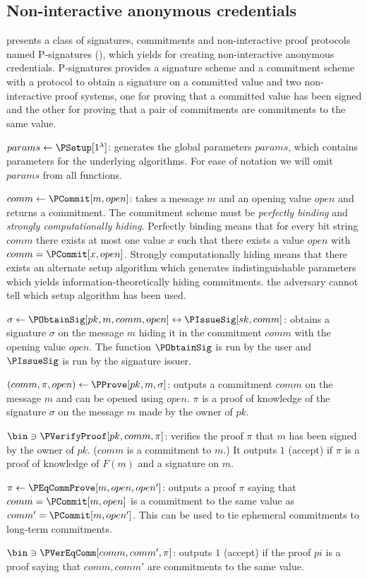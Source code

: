 \subsection{Non-interactive anonymous credentials}%
\label{NIZK-anon-cred}


 presents a class of signatures, commitments and 
non-interactive proof protocols named P-signatures (\Psig), which yields for 
creating non-interactive anonymous credentials.
P-signatures provides a signature scheme and a commitment scheme with a protocol 
to obtain a signature on a committed value and two non-interactive proof 
systems, one for proving that a committed value has been signed and the other 
for proving that a pair of commitments are commitments to the same value.


\(params\gets \PSetup[1^\lambda]\): generates the global parameters \(params\), 
which contains parameters for the underlying algorithms.
For ease of notation we will omit \(params\) from all functions.


\(comm\gets \PCommit[m, open]\): takes a message \(m\) and an opening value 
\(open\) and returns a commitment.
The commitment scheme must be \emph{perfectly binding} and \emph{strongly 
  computationally hiding}.
Perfectly binding means that for every bit string \(comm\) there exists at most 
one value \(x\) such that there exists a value \(open\) with \(comm = 
  \PCommit[x, open]\).
Strongly computationally hiding means that there exists an alternate setup 
algorithm which generates indistinguishable parameters which yields 
information-theoretically hiding commitments.
\Ie the adversary cannot tell which setup algorithm has been used.


\(\sigma\gets \PObtainSig[pk, m, comm, open]\leftrightarrow
  \PIssueSig[sk, comm]\): obtains a signature \(\sigma\) on the message 
\(m\) hiding it in the commitment \(comm\) with the opening value \(open\).
The function \(\PObtainSig\) is run by the user and \(\PIssueSig\) is run by the 
signature issuer.


\((comm, \pi, open)\gets \PProve[pk, m, \sigma]\): outputs a commitment 
\(comm\) on the message \(m\) and can be opened using \(open\).
\(\pi\) is a proof of knowledge of the signature \(\sigma\) on the message \(m\) 
made by the owner of \(pk\).


\(\bin\ni \PVerifyProof[pk, comm, \pi]\): verifies the proof \(\pi\) that \(m\) 
has been signed by the owner of \(pk\).
(\(comm\) is a commitment to \(m\).)
It outputs \(1\) (accept) if \(\pi\) is a proof of knowledge of \(F(m)\) and a 
signature on \(m\).


\(\pi\gets \PEqCommProve[m, open, open']\): outputs a proof \(\pi\) saying that 
\(comm = \PCommit[m, open]\) is a commitment to the same value as \(comm' = 
  \PCommit[m, open']\).
This can be used to tie ephemeral commitments to long-term commitments.


\(\bin\ni \PVerEqComm[comm, comm', \pi]\): outputs \(1\) (accept) if the proof 
\(pi\) is a proof saying that \(comm, comm'\) are commitments to the same value.
